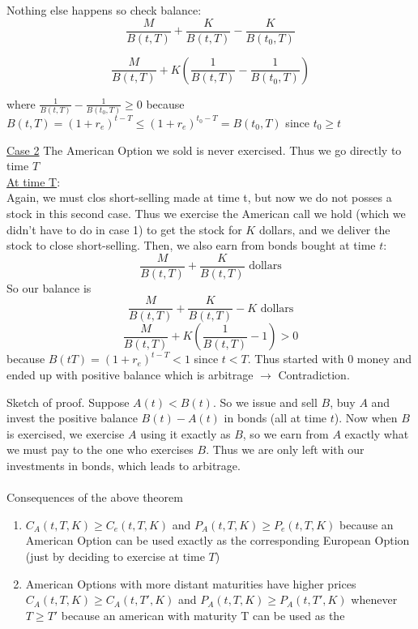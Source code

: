 \documentclass[oneside]{book}
\begin{document}
{    Nothing else happens so check balance:
    $$
        \frac{M}{B(t,T)} + \frac{K}{B(t,T)} - \frac{K}{B(t_0, T)}
    $$

    $$
        \frac{M}{B(t,T)} + K \left( \frac{1}{B(t,T)} - \frac{1}{B(t_0, T)} \right)
    $$

    where $\frac{1}{B(t,T)} - \frac{1}{B(t_0, T)} \geq 0$ because
        $B(t,T) = (1+r_e)^{t-T} \leq (1+r_e)^{t_0-T} = B(t_0, T)$ since $t_0 \geq t$



    \underline{Case 2} The American Option we sold is never exercised. Thus we go
    directly to time $T$ \\
    \underline{At time T}: \\
    Again, we must clos short-selling made at time t, but now we do not posses a stock in
    this second case. Thus we exercise the American call we hold (which we didn't have
    to do in case 1) to get the stock for $K$ dollars, and we deliver the stock to close
    short-selling. Then, we also earn from bonds bought at time $t$:
    $$
        \frac{M}{B(t,T)} + \frac{K}{B(t,T)} \text{ dollars}
    $$
    So our balance is
    $$
        \frac{M}{B(t,T)} + \frac{K}{B(t,T)} - K \text{ dollars}
    $$
    $$
        \frac{M}{B(t,T)} + K\left(\frac{1}{B(t,T)} - 1\right)  > 0
    $$
    because $B(t T) = (1+r_e)^{t-T} < 1$ since $t<T$. Thus started with 0 money and ended
    up with positive balance which is arbitrage $\rightarrow$ Contradiction.
}

Sketch of proof. Suppose $A(t) < B(t)$. So we issue and sell $B$, buy $A$ and invest the
positive balance $B(t) - A(t)$ in bonds (all at time $t$). Now when $B$ is exercised, we
exercise $A$ using it exactly as $B$, so we earn from $A$ exactly what we must pay to the one
who exercises $B$. Thus we are only left with our investments in bonds, which leads to
arbitrage. \\
\\
Consequences of the above theorem
\begin{enumerate}
    \item $C_A(t, T, K) \geq C_e(t, T, K)$ and $P_A(t,T,K) \geq P_e(t, T, K)$ because an
    American Option can be used exactly as the corresponding European Option (just by deciding
    to exercise at time $T$)
    \item American Options with more distant maturities have higher prices
    $C_A(t, T, K) \geq C_A(t, T', K)$ and $P_A(t,T,K) \geq P_A(t, T', K)$ whenever
    $T \geq T'$ because an american with maturity T can be used as the
\end{enumerate}
\end{document}

